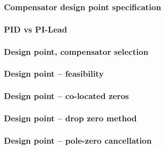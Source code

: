 \documentclass[aspectratio=169]{beamer}
\begin{document}
\begin{frame}
\frametitle{Compensator design point specification}
\end{frame}

\begin{frame}
\frametitle{PID vs PI-Lead}
\end{frame}

\begin{frame}
\frametitle{Design point, compensator selection}
\end{frame}

\begin{frame}
\frametitle{Design point -- feasibility}
\end{frame}

\begin{frame}
\frametitle{Design point -- co-located zeros}
\end{frame}

\begin{frame}
\frametitle{Design point -- drop zero method}
\end{frame}

\begin{frame}
\frametitle{Design point -- pole-zero cancellation}
\end{frame}
\end{document}
